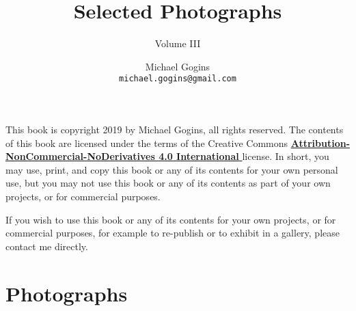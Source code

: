 

\frontmatter
\title{Selected Photographs}
\author{Michael Gogins \\ \texttt{michael.gogins@gmail.com}}
\subtitle{Volume III}
\dedication{This book is for Mick.}
\newpage
\noindent This book is copyright 2019 by Michael Gogins, all rights reserved. The contents of this book are licensed under the terms of the Creative Commons \href{https://creativecommons.org/licenses/by-nc-nd/4.0/legalcode}{\textbf{Attribution-NonCommercial-NoDerivatives 4.0 International} } license. In short, you may use, print, and copy this book or any of its contents for your own personal use, but you may not use this book or any of its contents as part of your own projects, or for commercial purposes.

If you wish to use this book or any of its contents for your own projects, or for commercial purposes, for example to re-publish or to exhibit in a gallery, please contact me directly.
\maketitle

\tableofcontents
{
	\setlength{}
	\raggedright
	\listoffigures
}

\mainmatter
{}

\chapter{Photographs}




